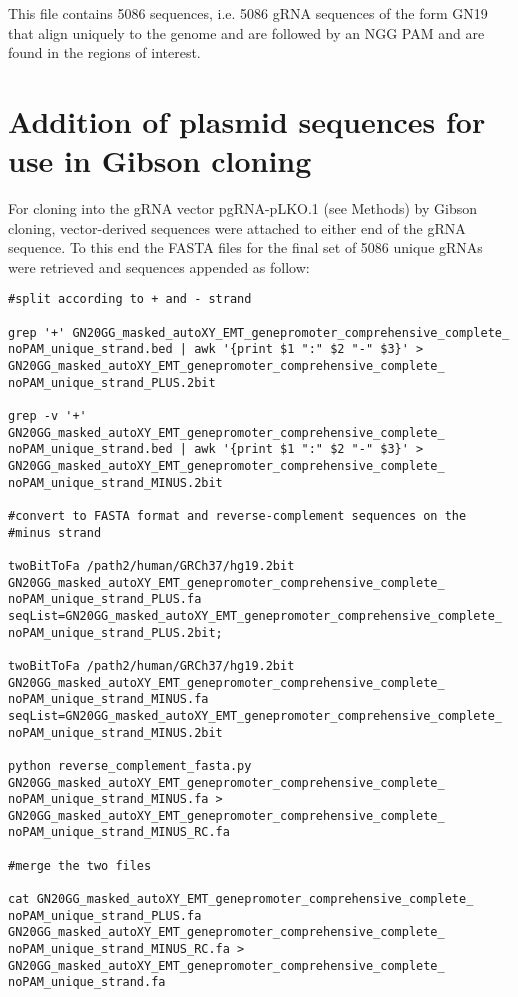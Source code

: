 This file contains 5086 sequences, i.e. 5086 gRNA sequences of the form GN19 that align uniquely to the genome and are followed by an NGG PAM and are found in the regions of interest.

\section{Addition of plasmid sequences for use in Gibson cloning}
For cloning into the gRNA vector pgRNA-pLKO.1 (see Methods) by Gibson cloning, vector-derived sequences were attached to either end of the gRNA sequence. To this end the FASTA files for the final set of 5086 unique gRNAs were retrieved and sequences appended as follow:

\begin{small}\begin{lstlisting}
#split according to + and - strand 

grep '+' GN20GG_masked_autoXY_EMT_genepromoter_comprehensive_complete_ noPAM_unique_strand.bed | awk '{print $1 ":" $2 "-" $3}' > GN20GG_masked_autoXY_EMT_genepromoter_comprehensive_complete_ noPAM_unique_strand_PLUS.2bit

grep -v '+' GN20GG_masked_autoXY_EMT_genepromoter_comprehensive_complete_ noPAM_unique_strand.bed | awk '{print $1 ":" $2 "-" $3}' > GN20GG_masked_autoXY_EMT_genepromoter_comprehensive_complete_ noPAM_unique_strand_MINUS.2bit

#convert to FASTA format and reverse-complement sequences on the 
#minus strand

twoBitToFa /path2/human/GRCh37/hg19.2bit GN20GG_masked_autoXY_EMT_genepromoter_comprehensive_complete_ noPAM_unique_strand_PLUS.fa seqList=GN20GG_masked_autoXY_EMT_genepromoter_comprehensive_complete_ noPAM_unique_strand_PLUS.2bit;

twoBitToFa /path2/human/GRCh37/hg19.2bit GN20GG_masked_autoXY_EMT_genepromoter_comprehensive_complete_ noPAM_unique_strand_MINUS.fa seqList=GN20GG_masked_autoXY_EMT_genepromoter_comprehensive_complete_ noPAM_unique_strand_MINUS.2bit

python reverse_complement_fasta.py GN20GG_masked_autoXY_EMT_genepromoter_comprehensive_complete_ noPAM_unique_strand_MINUS.fa > GN20GG_masked_autoXY_EMT_genepromoter_comprehensive_complete_ noPAM_unique_strand_MINUS_RC.fa

#merge the two files

cat GN20GG_masked_autoXY_EMT_genepromoter_comprehensive_complete_
noPAM_unique_strand_PLUS.fa GN20GG_masked_autoXY_EMT_genepromoter_comprehensive_complete_
noPAM_unique_strand_MINUS_RC.fa > GN20GG_masked_autoXY_EMT_genepromoter_comprehensive_complete_
noPAM_unique_strand.fa


\end{lstlisting}
\end{small}
